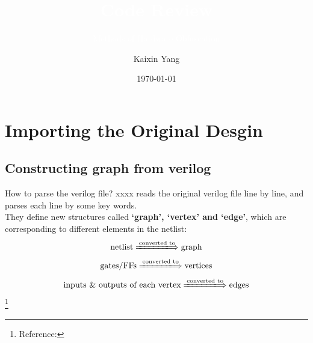 \documentclass{beamer}
\title{\textcolor{white}{Code Review}}
\subtitle{\textcolor{white}{Methods of Hardware Obfuscation}}
\author{Kaixin Yang}
\date{\today}
\begin{document}
\begin{frame}
\titlepage
\end{frame}


\begin{frame}
\tableofcontents
\end{frame}


\section{Importing the Original Desgin}


\subsection{Constructing graph from verilog}
\begin{frame}{How to parse the verilog file?}
xxxx reads the original verilog file line by line, and parses each line by some key words. \\
They define new structures called \textcolor{MyRed}{\bf `graph', `vertex' and `edge'}, which are corresponding to different elements in the netlist:
$$\text{netlist}\xLongrightarrow{\text{converted to}}\text{graph}$$ 
$$\text{gates/FFs}\xLongrightarrow{\text{converted to}}\text{vertices}$$ 
$$\text{inputs \& outputs of each vertex}\xLongrightarrow{\text{converted to}}\text{edges}$$ 
\footnote{\tiny Reference:}
\end{frame}


\end{document}
